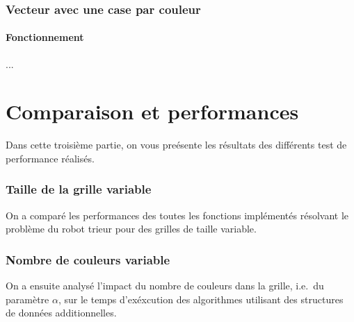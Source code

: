 \documentclass[12pt,a4paper]{article}
\begin{document}
\section{Vecteur avec une case par couleur}
\subsection*{Fonctionnement}
...
\newpage

\part{Comparaison et performances}
Dans cette troisi\`eme partie, on vous pre\'esente les r\'esultats des 
diff\'erents test de performance r\'ealis\'es.

\section{Taille de la grille variable}
On a compar\'e les performances des toutes les fonctions impl\'ement\'es r\'esolvant le probl\`eme du robot trieur pour des grilles de taille variable.

\section{Nombre de couleurs variable}
On a ensuite analys\'e l'impact du nombre de couleurs dans la grille, i.e.\ du param\`etre $\alpha$, sur le temps d'ex\'excution des algorithmes utilisant des structures de donn\'ees additionnelles.

\end{document}
